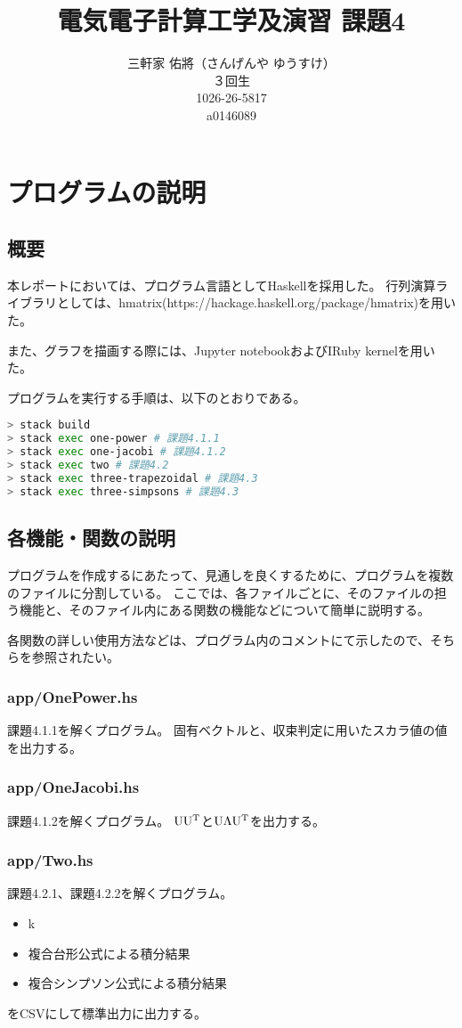 \documentclass[11pt]{jsarticle}
\title{電気電子計算工学及演習 課題4}
\author{三軒家 佑將（さんげんや ゆうすけ） \\ ３回生 \\ 1026-26-5817 \\ a0146089}
\date{}
\begin{document}
\maketitle

\section{プログラムの説明}
\subsection{概要}
本レポートにおいては、プログラム言語としてHaskellを採用した。
行列演算ライブラリとしては、hmatrix(https://hackage.haskell.org/package/hmatrix)を用いた。

また、グラフを描画する際には、Jupyter notebookおよびIRuby kernelを用いた。

プログラムを実行する手順は、以下のとおりである。
\begin{lstlisting}[language=bash]
> stack build
> stack exec one-power # 課題4.1.1
> stack exec one-jacobi # 課題4.1.2
> stack exec two # 課題4.2
> stack exec three-trapezoidal # 課題4.3
> stack exec three-simpsons # 課題4.3
\end{lstlisting}

\subsection{各機能・関数の説明}
プログラムを作成するにあたって、見通しを良くするために、プログラムを複数のファイルに分割している。
ここでは、各ファイルごとに、そのファイルの担う機能と、そのファイル内にある関数の機能などについて簡単に説明する。

各関数の詳しい使用方法などは、プログラム内のコメントにて示したので、そちらを参照されたい。

\subsubsection*{app/OnePower.hs}
課題4.1.1を解くプログラム。
固有ベクトルと、収束判定に用いたスカラ値の値を出力する。

\subsubsection*{app/OneJacobi.hs}
課題4.1.2を解くプログラム。
${\rm U} {\rm U}^{\rm T}$と${\rm U}\Lambda{\rm U}^{\rm T}$を出力する。

\subsubsection*{app/Two.hs}
課題4.2.1、課題4.2.2を解くプログラム。
\begin{itemize}
    \item k
    \item 複合台形公式による積分結果
    \item 複合シンプソン公式による積分結果
\end{itemize}
をCSVにして標準出力に出力する。
\end{document}
